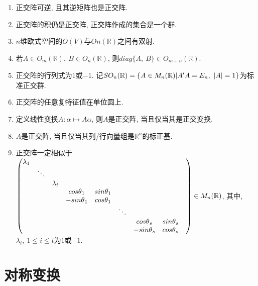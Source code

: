 \begin{property}
    \par
    \begin{enumerate}[itemindent=1em]
        \item 正交阵可逆, 且其逆矩阵也是正交阵.
        \item 正交阵的积仍是正交阵, 正交阵作成的集合是一个群.
        \item $n$维欧式空间的$O(V)$与$On(\mathbb{R})$之间有双射.
        \item 若$A\in O_m(\mathbb{R}),\ B\in O_n(\mathbb{R})$, 则$diag\{A,\ B\}\in O_{m+n}(\mathbb{R})$.
        \item 正交阵的行列式为$1$或$-1$. 记$SO_n(\mathbb{R})=\{A\in M_n(\mathbb{R})|A'A=E_n,\ \vert A\vert=1\}$为标准正交群.
        \item 正交阵的任意复特征值在单位圆上.
        \item 定义线性变换$A: \alpha\mapsto A\alpha$, 则$A$是正交阵, 当且仅当其是正交变换.
        \item $A$是正交阵, 当且仅当其列/行向量组是$\mathbb{R}^n$的标正基.
        \item 正交阵一定相似于$\begin{pmatrix}
            \lambda{_1} &      &           &             &             & & & & \\
                        &\ddots&           &             &             & & & & \\
                        &      &\lambda{_t}&             &             & & & & \\
                        &      &           & cos\theta{_1}&sin\theta{_1}& & & & \\
                        &      &           &-sin\theta{_1}&cos\theta{_1}&      & & & \\
                        &      &           &              &             &\ddots& & & \\
                        &      &           &              &             &      &cos\theta{_s}&sin\theta{_s}& \\
                        &      &           &              &             &      &-sin\theta{_s}&cos\theta{_s}&
        \end{pmatrix}\in M_{n}(\mathbb{R})$, 其中, $\lambda{_i},\ 1\le i \le t$为$1$或$-1$.
    \end{enumerate}
\end{property}

\section{ 对称变换 }


